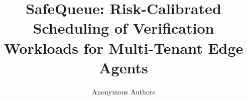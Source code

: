 \documentclass[10pt]{article}
\title{SafeQueue: Risk-Calibrated Scheduling of Verification Workloads for Multi-Tenant Edge Agents}
\author{Anonymous Authors}
\date{}
\begin{document}
\maketitle

\begin{abstract}

\end{abstract}











\end{document}
